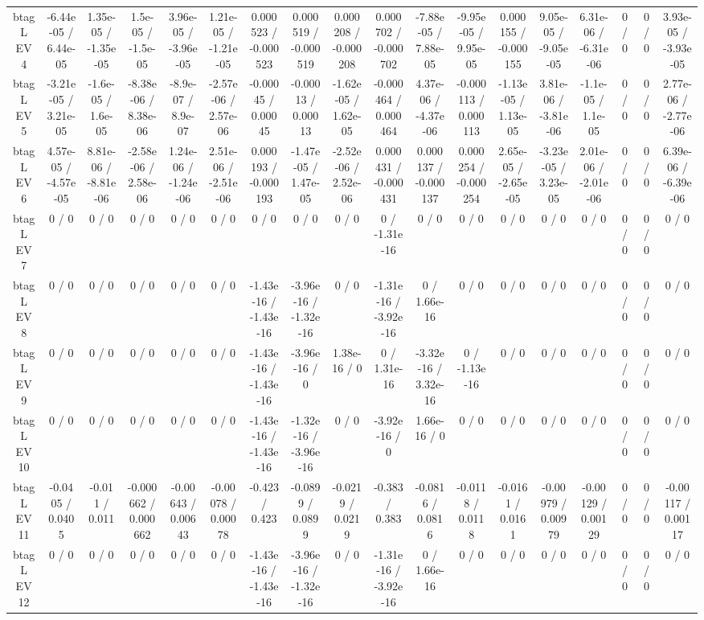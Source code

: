 \documentclass[10pt]{article}
\begin{document}
\begin{table}[htbp]
\begin{center}
\begin{tabular}{|c|c|c|c|c|c|c|c|c|c|c|c|c|c|c|c|c|c|}
  btag L EV 4 & -6.44e-05 / 6.44e-05 & 1.35e-05 / -1.35e-05 & 1.5e-05 / -1.5e-05 & 3.96e-05 / -3.96e-05 & 1.21e-05 / -1.21e-05 & 0.000523 / -0.000523 & 0.000519 / -0.000519 & 0.000208 / -0.000208 & 0.000702 / -0.000702 & -7.88e-05 / 7.88e-05 & -9.95e-05 / 9.95e-05 & 0.000155 / -0.000155 & 9.05e-05 / -9.05e-05 & 6.31e-06 / -6.31e-06 & 0 / 0 & 0 / 0 & 3.93e-05 / -3.93e-05 \\ 
  btag L EV 5 & -3.21e-05 / 3.21e-05 & -1.6e-05 / 1.6e-05 & -8.38e-06 / 8.38e-06 & -8.9e-07 / 8.9e-07 & -2.57e-06 / 2.57e-06 & -0.00045 / 0.00045 & -0.00013 / 0.00013 & -1.62e-05 / 1.62e-05 & -0.000464 / 0.000464 & 4.37e-06 / -4.37e-06 & -0.000113 / 0.000113 & -1.13e-05 / 1.13e-05 & 3.81e-06 / -3.81e-06 & -1.1e-05 / 1.1e-05 & 0 / 0 & 0 / 0 & 2.77e-06 / -2.77e-06 \\ 
  btag L EV 6 & 4.57e-05 / -4.57e-05 & 8.81e-06 / -8.81e-06 & -2.58e-06 / 2.58e-06 & 1.24e-06 / -1.24e-06 & 2.51e-06 / -2.51e-06 & 0.000193 / -0.000193 & -1.47e-05 / 1.47e-05 & -2.52e-06 / 2.52e-06 & 0.000431 / -0.000431 & 0.000137 / -0.000137 & 0.000254 / -0.000254 & 2.65e-05 / -2.65e-05 & -3.23e-05 / 3.23e-05 & 2.01e-06 / -2.01e-06 & 0 / 0 & 0 / 0 & 6.39e-06 / -6.39e-06 \\ 
  btag L EV 7 & 0 / 0 & 0 / 0 & 0 / 0 & 0 / 0 & 0 / 0 & 0 / 0 & 0 / 0 & 0 / 0 & 0 / -1.31e-16 & 0 / 0 & 0 / 0 & 0 / 0 & 0 / 0 & 0 / 0 & 0 / 0 & 0 / 0 & 0 / 0 \\ 
  btag L EV 8 & 0 / 0 & 0 / 0 & 0 / 0 & 0 / 0 & 0 / 0 & -1.43e-16 / -1.43e-16 & -3.96e-16 / -1.32e-16 & 0 / 0 & -1.31e-16 / -3.92e-16 & 0 / 1.66e-16 & 0 / 0 & 0 / 0 & 0 / 0 & 0 / 0 & 0 / 0 & 0 / 0 & 0 / 0 \\ 
  btag L EV 9 & 0 / 0 & 0 / 0 & 0 / 0 & 0 / 0 & 0 / 0 & -1.43e-16 / -1.43e-16 & -3.96e-16 / 0 & 1.38e-16 / 0 & 0 / 1.31e-16 & -3.32e-16 / 3.32e-16 & 0 / -1.13e-16 & 0 / 0 & 0 / 0 & 0 / 0 & 0 / 0 & 0 / 0 & 0 / 0 \\ 
  btag L EV 10 & 0 / 0 & 0 / 0 & 0 / 0 & 0 / 0 & 0 / 0 & -1.43e-16 / -1.43e-16 & -1.32e-16 / -3.96e-16 & 0 / 0 & -3.92e-16 / 0 & 1.66e-16 / 0 & 0 / 0 & 0 / 0 & 0 / 0 & 0 / 0 & 0 / 0 & 0 / 0 & 0 / 0 \\ 
  btag L EV 11 & -0.0405 / 0.0405 & -0.011 / 0.011 & -0.000662 / 0.000662 & -0.00643 / 0.00643 & -0.00078 / 0.00078 & -0.423 / 0.423 & -0.0899 / 0.0899 & -0.0219 / 0.0219 & -0.383 / 0.383 & -0.0816 / 0.0816 & -0.0118 / 0.0118 & -0.0161 / 0.0161 & -0.00979 / 0.00979 & -0.00129 / 0.00129 & 0 / 0 & 0 / 0 & -0.00117 / 0.00117 \\ 
  btag L EV 12 & 0 / 0 & 0 / 0 & 0 / 0 & 0 / 0 & 0 / 0 & -1.43e-16 / -1.43e-16 & -3.96e-16 / -1.32e-16 & 0 / 0 & -1.31e-16 / -3.92e-16 & 0 / 1.66e-16 & 0 / 0 & 0 / 0 & 0 / 0 & 0 / 0 & 0 / 0 & 0 / 0 & 0 / 0 \\ 

\end{tabular}
\end{center}
\end{table}
\end{document}
